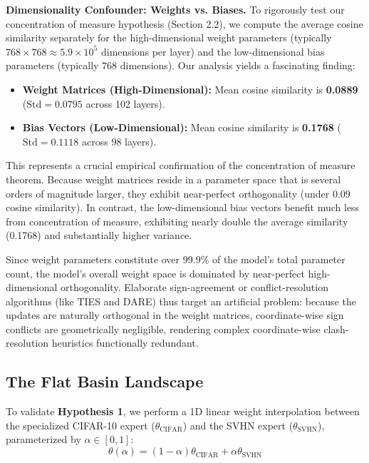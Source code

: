 \documentclass{article}
\begin{document}
\textbf{Dimensionality Confounder: Weights vs. Biases.} To rigorously test our concentration of measure hypothesis (Section 2.2), we compute the average cosine similarity separately for the high-dimensional weight parameters (typically $768 \times 768 \approx 5.9 \times 10^5$ dimensions per layer) and the low-dimensional bias parameters (typically $768$ dimensions). Our analysis yields a fascinating finding:
\begin{itemize}
    \item \textbf{Weight Matrices (High-Dimensional):} Mean cosine similarity is \textbf{0.0889} ($\text{Std} = 0.0795$ across 102 layers).
    \item \textbf{Bias Vectors (Low-Dimensional):} Mean cosine similarity is \textbf{0.1768} ($\text{Std} = 0.1118$ across 98 layers).
\end{itemize}
This represents a crucial empirical confirmation of the concentration of measure theorem. Because weight matrices reside in a parameter space that is several orders of magnitude larger, they exhibit near-perfect orthogonality (under 0.09 cosine similarity). In contrast, the low-dimensional bias vectors benefit much less from concentration of measure, exhibiting nearly double the average similarity (0.1768) and substantially higher variance. 

Since weight parameters constitute over 99.9\% of the model's total parameter count, the model's overall weight space is dominated by near-perfect high-dimensional orthogonality. Elaborate sign-agreement or conflict-resolution algorithms (like TIES and DARE) thus target an artificial problem: because the updates are naturally orthogonal in the weight matrices, coordinate-wise sign conflicts are geometrically negligible, rendering complex coordinate-wise clash-resolution heuristics functionally redundant.

\subsection{The Flat Basin Landscape}

To validate \textbf{Hypothesis 1}, we perform a 1D linear weight interpolation between the specialized CIFAR-10 expert ($\theta_{\text{CIFAR}}$) and the SVHN expert ($\theta_{\text{SVHN}}$), parameterized by $\alpha \in [0, 1]$:
\begin{equation}
    \theta(\alpha) = (1-\alpha)\theta_{\text{CIFAR}} + \alpha \theta_{\text{SVHN}}
\end{equation}
\end{document}
